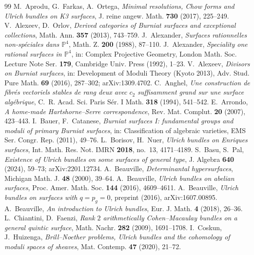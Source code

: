 \documentclass[10pt,a4paper]{amsart}
\newcommand{\PP}{\mathbb{P}}
\begin{document}
\begin{thebibliography}{99}
 M.~Aprodu, G.~Farkas, A.~Ortega, \emph{Minimal resolutions, Chow forms and Ulrich bundles on K3 surfaces}, J. reine angew. Math. \textbf{730} (2017), 225--249.
 V.~Alexeev, D.~Orlov, \emph{Derived categories of Burniat surfaces and exceptional collections}, Math. Ann. \textbf{357} (2013), 743--759.
 J.~Alexander, \emph{Surfaces rationnelles non-sp\'eciales dans $\PP^4$}, Math. Z. \textbf{200} (1988), 87--110.
 J.~Alexander, \emph{Speciality one rational surfaces in $\PP^4$}, in: Complex Projective Geometry, London Math. Soc. Lecture Note Ser. \textbf{179}, Cambridge Univ. Press (1992), 1--23.
 V.~Alexeev, \emph{Divisors on Burniat surfaces}, in: Development of Moduli Theory (Kyoto 2013), Adv. Stud. Pure Math. \textbf{69} (2016), 287--302; arXiv:1309.4702.
 C.~Anghel, \emph{Une construction de fibr\'es vectoriels stables de rang deux avec $c_2$ suffisamment grand sur une surface alg\'ebrique}, C.~R. Acad. Sci. Paris S\'er. I Math. \textbf{318} (1994), 541--542.
 E.~Arrondo, \emph{A home-made Hartshorne--Serre correspondence}, Rev. Mat. Complut. \textbf{20} (2007), 423--443.
 I.~Bauer, F.~Catanese, \emph{Burniat surfaces I: fundamental groups and moduli of primary Burniat surfaces}, in: Classification of algebraic varieties, EMS Ser. Congr. Rep. (2011), 49--76.
 L.~Borisov, H.~Nuer, \emph{Ulrich bundles on Enriques surfaces}, Int. Math. Res. Not. IMRN \textbf{2018}, no.~13, 4171--4189.
 S.~Basu, S.~Pal, \emph{Existence of Ulrich bundles on some surfaces of general type}, J. Algebra \textbf{640} (2024), 59--73; arXiv:2201.12734.
 A.~Beauville, \emph{Determinantal hypersurfaces}, Michigan Math. J. \textbf{48} (2000), 39--64.
 A.~Beauville, \emph{Ulrich bundles on abelian surfaces}, Proc. Amer. Math. Soc. \textbf{144} (2016), 4609--4611.
 A.~Beauville, \emph{Ulrich bundles on surfaces with $q=p_g=0$}, preprint (2016), arXiv:1607.00895.
 A.~Beauville, \emph{An introduction to Ulrich bundles}, Eur. J. Math. \textbf{4} (2018), 26--36.
 L.~Chiantini, D.~Faenzi, \emph{Rank $2$ arithmetically Cohen--Macaulay bundles on a general quintic surface}, Math. Nachr. \textbf{282} (2009), 1691--1708.
 I.~Coskun, J.~Huizenga, \emph{Brill--Noether problems, Ulrich bundles and the cohomology of moduli spaces of sheaves}, Mat. Contemp. \textbf{47} (2020), 21--72.

\end{thebibliography}
\end{document}

